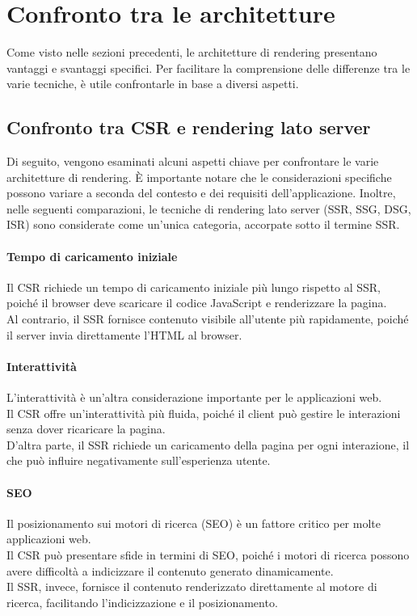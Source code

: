 \section{Confronto tra le architetture}

Come visto nelle sezioni precedenti, le architetture di rendering presentano vantaggi e svantaggi specifici.
Per facilitare la comprensione delle differenze tra le varie tecniche, è utile confrontarle in base a diversi aspetti.

\subsection{Confronto tra CSR e rendering lato server}
Di seguito, vengono esaminati alcuni aspetti chiave per confrontare le varie architetture di rendering.
È importante notare che le considerazioni specifiche possono variare a seconda del contesto e dei requisiti
dell'applicazione.
Inoltre, nelle seguenti comparazioni, le tecniche di rendering lato server (SSR, SSG, DSG, ISR) sono considerate come
un'unica categoria, accorpate sotto il termine SSR.

\paragraph{Tempo di caricamento iniziale}
Il CSR richiede un tempo di caricamento iniziale più lungo rispetto al SSR, poiché il browser deve scaricare il
codice JavaScript e renderizzare la pagina.\\
Al contrario, il SSR fornisce contenuto visibile all'utente più rapidamente, poiché il server invia direttamente
l'HTML al browser.

\paragraph{Interattività}
L'interattività è un'altra considerazione importante per le applicazioni web.\\
Il CSR offre un'interattività più fluida, poiché il client può gestire le interazioni senza dover ricaricare la pagina.\\
D'altra parte, il SSR richiede un caricamento della pagina per ogni interazione, il che può influire negativamente
sull'esperienza utente.

\paragraph{SEO}
Il posizionamento sui motori di ricerca (SEO) è un fattore critico per molte applicazioni web.\\
Il CSR può presentare sfide in termini di SEO, poiché i motori di ricerca possono avere difficoltà a indicizzare il
contenuto generato dinamicamente.\\
Il SSR, invece, fornisce il contenuto renderizzato direttamente al motore di ricerca, facilitando l'indicizzazione e il posizionamento.

